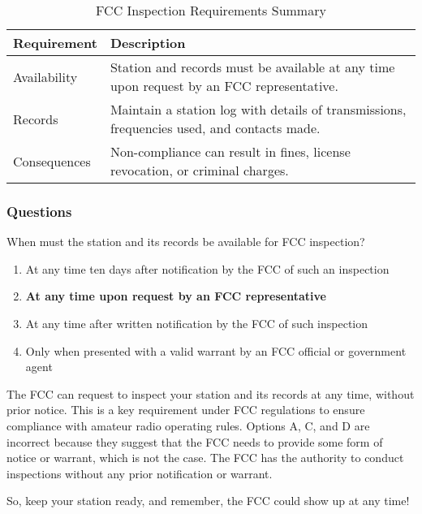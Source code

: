\begin{table}[h]
    \footnotesize
    \centering
    \begin{tabular}{|l|l|}
        \hline
        \textbf{Requirement} & \textbf{Description} \\
        \hline
        Availability & Station and records must be available at any time upon request by an FCC representative. \\
        \hline
        Records & Maintain a station log with details of transmissions, frequencies used, and contacts made. \\
        \hline
        Consequences & Non-compliance can result in fines, license revocation, or criminal charges. \\
        \hline
    \end{tabular}
    \caption{FCC Inspection Requirements Summary}
    \label{tab:fcc-inspection-summary}
\end{table}

\subsubsection*{Questions}

\begin{tcolorbox}[colback=gray!10!white,colframe=black!75!black,title={T1F01}]
    When must the station and its records be available for FCC inspection?
    \begin{enumerate}[label=\Alph*),noitemsep]
        \item At any time ten days after notification by the FCC of such an inspection
        \item \textbf{At any time upon request by an FCC representative}
        \item At any time after written notification by the FCC of such inspection
        \item Only when presented with a valid warrant by an FCC official or government agent
    \end{enumerate}
\end{tcolorbox}

The FCC can request to inspect your station and its records at any time, without prior notice. This is a key requirement under FCC regulations to ensure compliance with amateur radio operating rules. Options A, C, and D are incorrect because they suggest that the FCC needs to provide some form of notice or warrant, which is not the case. The FCC has the authority to conduct inspections without any prior notification or warrant.

So, keep your station ready, and remember, the FCC could show up at any time!
